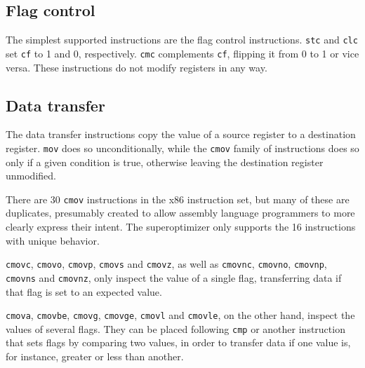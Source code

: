 \documentclass[a4paper,11pt]{kth-mag}
\begin{document}
\subsection{Flag control}

The simplest supported instructions are the flag control instructions.
\verb|stc| and \verb|clc| set \verb|cf| to 1 and 0, respectively.
\verb|cmc| complements \verb|cf|, flipping it from 0 to 1 or vice versa.
These instructions do not modify registers in any way.

\subsection{Data transfer}

The data transfer instructions copy the value of a source register to a destination register.
\verb|mov| does so unconditionally, while the \verb|cmov| family of instructions does so only if a given condition is true, otherwise leaving the destination register unmodified.

There are 30 \verb|cmov| instructions in the x86 instruction set, but many of these are duplicates, presumably created to allow assembly language programmers to more clearly express their intent.
The superoptimizer only supports the 16 instructions with unique behavior.

\verb|cmovc|, \verb|cmovo|, \verb|cmovp|, \verb|cmovs| and \verb|cmovz|, as well as \verb|cmovnc|, \verb|cmovno|, \verb|cmovnp|, \verb|cmovns| and \verb|cmovnz|, only inspect the value of a single flag, transferring data if that flag is set to an expected value.

\verb|cmova|, \verb|cmovbe|, \verb|cmovg|, \verb|cmovge|, \verb|cmovl| and \verb|cmovle|, on the other hand, inspect the values of several flags.
They can be placed following \verb|cmp| or another instruction that sets flags by comparing two values, in order to transfer data if one value is, for instance, greater or less than another.


\end{document}
